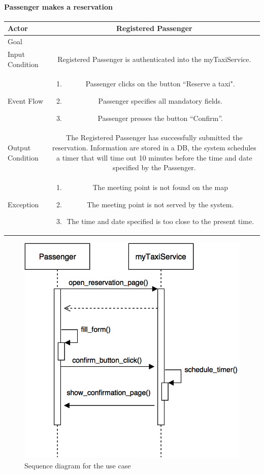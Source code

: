 \documentclass[a4paper,12pt,dvipsnames]{article}%
\newcommand{\usecasetable}[6]{
\begin{center}
\def\arraystretch{1.5}
\begin{tabularx}{\textwidth}{|s|C|}
\hline
Actor & #1\\
\hline
Goal & #2\\
\hline
Input Condition & #3 \\
\hline
Event Flow & #4\\
\hline
Output Condition & #5\\
\hline
Exception & #6\\
\hline
\end{tabularx}
\end{center}
}
\begin{document}
\paragraph{Passenger makes a reservation}
\usecasetable {Registered Passenger}{}{Registered Passenger is authenticated into the  myTaxiService.} 
{
\begin{minipage}[b]{11cm}
\begin{enumerate}
\item Passenger clicks on the button ``Reserve a taxi".
\item Passenger specifies all mandatory fields.
\item Passenger presses the button ``Confirm''.
\end{enumerate}
\end{minipage}
}
{The Registered Passenger has successfully submitted the reservation. Information are stored in a DB, the system schedules a timer that will time out 10 minutes before the time and date specified by the Passenger.}
{
\begin{minipage}[b]{11cm}
\begin{enumerate}
\item The meeting point is not found on the map
\item The meeting point is not served by the system.
\item The time and date specified is too close to the present time.
\end{enumerate}
\end{minipage}
}
\begin{figure}[H]
\centering
\includegraphics[scale=.3]{make_reservation.png}
\caption{Sequence diagram for the use case}
\end{figure}
\break
\end{document}
